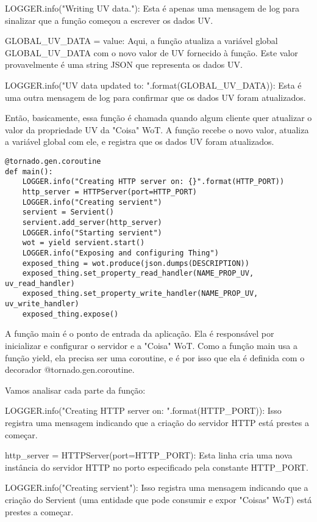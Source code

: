 LOGGER.info("Writing UV data."): Esta é apenas uma mensagem de log para sinalizar que a função começou a escrever os dados UV.

GLOBAL\_UV\_DATA = value: Aqui, a função atualiza a variável global GLOBAL\_UV\_DATA com o novo valor de UV fornecido à função. Este valor provavelmente é uma string JSON que representa os dados UV.

LOGGER.info("UV data updated to: {}".format(GLOBAL\_UV\_DATA)): Esta é uma outra mensagem de log para confirmar que os dados UV foram atualizados.

Então, basicamente, essa função é chamada quando algum cliente quer atualizar o valor da propriedade UV da "Coisa" WoT. A função recebe o novo valor, atualiza a variável global com ele, e registra que os dados UV foram atualizados.

\begin{verbatim}
@tornado.gen.coroutine
def main():
    LOGGER.info("Creating HTTP server on: {}".format(HTTP_PORT))
    http_server = HTTPServer(port=HTTP_PORT)
    LOGGER.info("Creating servient")
    servient = Servient()
    servient.add_server(http_server)
    LOGGER.info("Starting servient")
    wot = yield servient.start()
    LOGGER.info("Exposing and configuring Thing")
    exposed_thing = wot.produce(json.dumps(DESCRIPTION))
    exposed_thing.set_property_read_handler(NAME_PROP_UV, uv_read_handler)
    exposed_thing.set_property_write_handler(NAME_PROP_UV, uv_write_handler)
    exposed_thing.expose()
\end{verbatim}

A função main é o ponto de entrada da aplicação. Ela é responsável por inicializar e configurar o servidor e a "Coisa" WoT. Como a função main usa a função yield, ela precisa ser uma coroutine, e é por isso que ela é definida com o decorador @tornado.gen.coroutine.

Vamos analisar cada parte da função:

LOGGER.info("Creating HTTP server on: {}".format(HTTP\_PORT)): Isso registra uma mensagem indicando que a criação do servidor HTTP está prestes a começar.

http\_server = HTTPServer(port=HTTP\_PORT): Esta linha cria uma nova instância do servidor HTTP no porto especificado pela constante HTTP\_PORT.

LOGGER.info("Creating servient"): Isso registra uma mensagem indicando que a criação do Servient (uma entidade que pode consumir e expor "Coisas" WoT) está prestes a começar.


